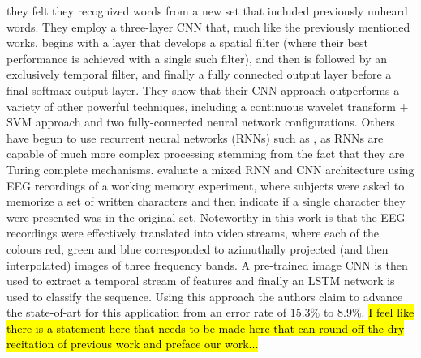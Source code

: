 \documentclass[utf8]{frontiersSCNS} %
\begin{document}
they felt they recognized words from a new set that included previously unheard words. They employ a three-layer CNN that, much like the previously mentioned works, begins with a layer that develops a spatial filter (where their best performance is achieved with a single such filter), and then is followed by an exclusively temporal filter, and finally a fully connected output layer before a final softmax output layer. They show that their CNN approach outperforms a variety of other powerful techniques, including a continuous wavelet transform + SVM approach and two fully-connected neural network configurations. Others have begun to use recurrent neural networks (RNNs) such as \cite{Bashivan2016}, as RNNs are capable of much more complex processing stemming from the fact that they are Turing complete mechanisms. \cite{Bashivan2016} evaluate a mixed RNN and CNN architecture using EEG recordings of a working memory experiment, where subjects were asked to memorize a set of written characters and then indicate if a single character they were presented was in the original set. Noteworthy in this work is that the EEG recordings were effectively translated into video streams, where each of the colours red, green and blue corresponded to azimuthally projected (and then interpolated) images of three frequency bands. A pre-trained image CNN is then used to extract a temporal stream of features and finally an LSTM network is used to classify the sequence. Using this approach the authors claim to advance the state-of-art for this application from an error rate of $15.3\%$ to $8.9\%$. \hl{I feel like there is a statement here that needs to be made here that can round off the dry recitation of previous work and preface our work...}


\end{document}
